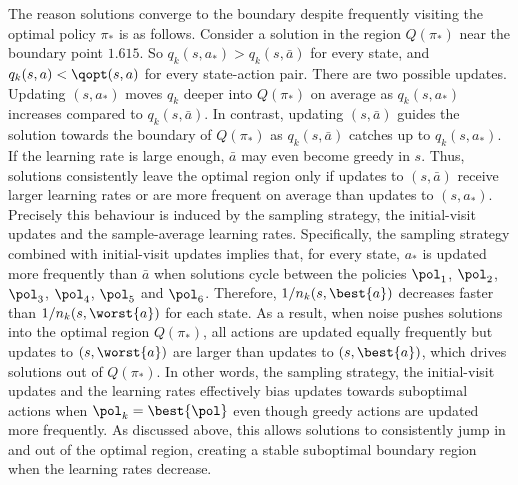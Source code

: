 \documentclass{article}
\begin{document}
The reason solutions converge to the boundary despite frequently visiting the optimal policy $\pi_*$ is as follows.
Consider a solution in the region $Q(\pi_*)$ near the boundary point $1.615$.
So $q_k(s, a_*) > q_k(s, \bar a)$ 
for every state,
and $q_k(s,a) < \qopt(s,a)$ for every state-action pair.
There are two possible updates.
Updating $(s, a_*)$ moves $q_k$ deeper into $Q(\pi_*)$ on average as $q_k(s, a_*)$ increases compared to $q_k(s, \bar a)$.
In contrast, updating $(s, \bar a)$ guides the solution towards the boundary of $Q(\pi_*)$ as $q_k(s, \bar a)$ catches up to $q_k(s, a_*)$. If the learning rate is large enough, 
$\bar a$ may even become greedy in $s$.
Thus, solutions consistently leave the optimal region only if 
updates to $(s, \bar a)$ receive larger learning rates or are more frequent on average than updates to $(s, a_*)$.
Precisely this behaviour is induced by the sampling strategy, the initial-visit updates and the sample-average learning rates.
Specifically, the sampling strategy 
combined with initial-visit updates implies that, for every state, $a_*$ is updated more frequently than $\bar a$ when solutions cycle between the policies $\pol_1$, $\pol_2$, $\pol_3$, $\pol_4$, $\pol_5$ and $\pol_6$.
Therefore, $1/n_k(s, \best{a})$ decreases faster than $1/n_k(s, \worst{a})$ for each state.
As a result, when noise pushes solutions into the optimal region $Q(\pi_*)$, all actions are updated equally frequently but updates to $(s, \worst{a})$ are larger than updates to $(s, \best{a})$,
which drives solutions out of $Q(\pi_*)$.
In other words, the sampling strategy, the initial-visit updates and the learning rates effectively bias updates towards suboptimal actions when $\pol_k = \best{\pol}$ even though greedy actions are updated more frequently. 
As discussed above, this 
allows solutions to consistently jump in and out of the optimal region, creating a stable suboptimal boundary region when the learning rates decrease.
% 
\end{document}
